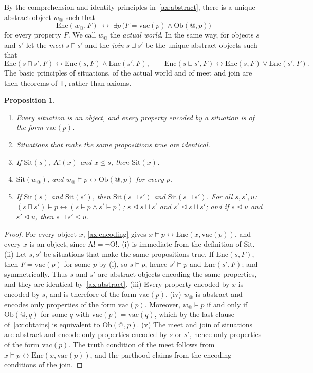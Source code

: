 \documentclass[11pt]{amsart}
\makeatletter
\theoremstyle{plain}
\newtheorem{proposition}[theorem]{Proposition}
\theoremstyle{definition}
\theoremstyle{remark}
\newcommand{\at}{@}
\newcommand{\aw}{w_{\at}}
\newcommand{\Sit}{\mathrm{Sit}}
\newcommand{\Enc}{\mathrm{Enc}}
\newcommand{\Obt}{\mathrm{Ob}}
\newcommand{\VAC}{\mathrm{vac}}
\newcommand{\Ord}{\mathrm{O!}}
\newcommand{\Abs}{\mathrm{A!}}
\newcommand{\partof}{\trianglelefteq}
\newcommand{\meet}{\sqcap}
\newcommand{\join}{\sqcup}
\newcommand{\T}{\mathsf{T}}
\makeatother
\begin{document}
By the comprehension and identity principles in~\ref{ax:abstract},
there is a unique abstract object $\aw$ such that
\[
  \Enc(\aw, F) \;\leftrightarrow\; \exists p\,
    \bigl(F = \VAC(p) \wedge \Obt(\at, p)\bigr)
\]
for every property $F$. We call $\aw$ the \emph{actual world}. In the
same way, for objects $s$ and $s'$ let the \emph{meet} $s \meet s'$ and
the \emph{join} $s \join s'$ be the unique abstract objects such that
\[
  \Enc(s \meet s', F) \leftrightarrow \Enc(s,F) \wedge \Enc(s',F),
  \qquad
  \Enc(s \join s', F) \leftrightarrow \Enc(s,F) \vee \Enc(s',F).
\]
The basic principles of situations, of the actual world and of meet
and join are then theorems of $\T$, rather than axioms.

\begin{proposition}
\label{prop:situations}
\begin{enumerate}[label=(\roman*)]
\item Every situation is an object, and every property encoded by a
  situation is of the form $\VAC(p)$.
\item Situations that make the same propositions true are identical.
\item If $\Sit(s)$, $\Abs(x)$ and $x \partof s$, then $\Sit(x)$.
\item $\Sit(\aw)$, and $\aw \models p \leftrightarrow \Obt(\at, p)$ for
  every $p$.
\item If $\Sit(s)$ and $\Sit(s')$, then $\Sit(s \meet s')$ and
  $\Sit(s \join s')$. For all $s, s', u$:
  $(s \meet s') \models p \leftrightarrow (s \models p \wedge
  s' \models p)$; $s \partof s \join s'$ and $s' \partof s \join s'$;
  and if $s \partof u$ and $s' \partof u$, then $s \join s' \partof u$.
\end{enumerate}
\end{proposition}

\begin{proof}
For every object $x$, \ref{ax:encoding} gives
$x \models p \leftrightarrow \Enc(x, \VAC(p))$, and every $x$ is an
object, since $\Abs = \neg\Ord$.
(i) is immediate from the definition of $\Sit$.
(ii) Let $s, s'$ be situations that make the same propositions true. If
$\Enc(s,F)$, then $F = \VAC(p)$ for some $p$ by (i), so $s \models p$,
hence $s' \models p$ and $\Enc(s',F)$; and symmetrically. Thus $s$ and
$s'$ are abstract objects encoding the same properties, and they are
identical by~\ref{ax:abstract}.
(iii) Every property encoded by $x$ is encoded by $s$, and is therefore
of the form $\VAC(p)$.
(iv) $\aw$ is abstract and encodes only properties of the form
$\VAC(p)$. Moreover, $\aw \models p$ if and only if
$\Obt(\at, q)$ for some $q$ with $\VAC(p) = \VAC(q)$, which by the last
clause of~\ref{ax:obtains} is equivalent to $\Obt(\at, p)$.
(v) The meet and join of situations are abstract and encode only
properties encoded by $s$ or $s'$, hence only properties of the form
$\VAC(p)$. The truth condition of the meet follows from
$x \models p \leftrightarrow \Enc(x, \VAC(p))$, and the parthood claims
from the encoding conditions of the join.
\end{proof}
\end{document}
